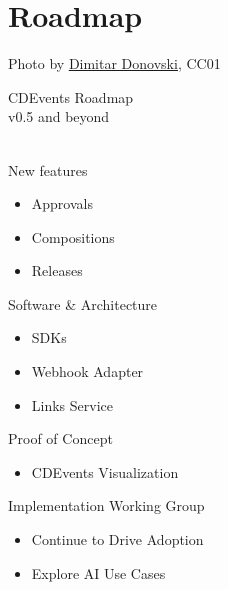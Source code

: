 \documentclass[aspectratio=169,11pt,hyperref={colorlinks=true}]{beamer}
\begin{document}
\section{Roadmap}
\begin{sectionwithpiclargecentral}{Photo by \href{https://unsplash.com/@dmtrdon}{\underline{Dimitar Donovski}}, CC0}{1}
\end{sectionwithpiclargecentral}

\begin{stripedframe}%
  {%
  CDEvents Roadmap \\
  v0.5 and beyond \\
  ~
  }%
  {%
  New features
  \vspace{0.02\textheight}
  \begin{itemize}
    \item Approvals
    \item Compositions
    \item Releases
  \end{itemize}
  }%
  {%
  Software \& Architecture
  \vspace{0.02\textheight}
  \begin{itemize}
    \item SDKs
    \item Webhook Adapter
    \item Links Service
  \end{itemize}
  }%
  {%
  Proof of Concept
  \vspace{0.02\textheight}
  \begin{itemize}
    \item CDEvents Visualization
  \end{itemize}
  }%
  {%
  Implementation Working Group
  \begin{itemize}
    \item Continue to Drive Adoption
    \item Explore AI Use Cases
  \end{itemize}
  }%
\end{stripedframe}
\end{document}
